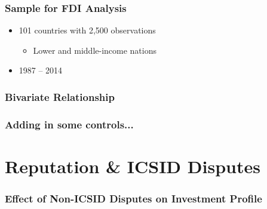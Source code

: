 \documentclass[10pt]{beamer}
\begin{document}
\begin{frame}
\frametitle{Sample for FDI Analysis}

\begin{itemize}
	\item 101 countries with 2,500 observations
	\begin{itemize}
		\item Lower and middle-income nations
	\end{itemize}
	\item 1987 -- 2014
\end{itemize}

\end{frame}

\begin{frame}
\frametitle{Bivariate Relationship}

\begin{figure}[ht]
	\centering
	\resizebox{1\textwidth}{!}{}	
\end{figure}

\end{frame}

\begin{frame}
\frametitle{Adding in some controls...}

\begin{figure}[ht]
	\centering
	\vspace{-5mm}
	\resizebox{1\textwidth}{!}{}	
\end{figure}

\end{frame}

\section{Reputation \& ICSID Disputes}

\begin{frame}
\frametitle{Effect of Non-ICSID Disputes on Investment Profile}

\begin{figure}[ht]
	\centering
	\vspace{-5mm}	
	\resizebox{1\textwidth}{!}{}	
\end{figure}

\end{frame}
\end{document}
